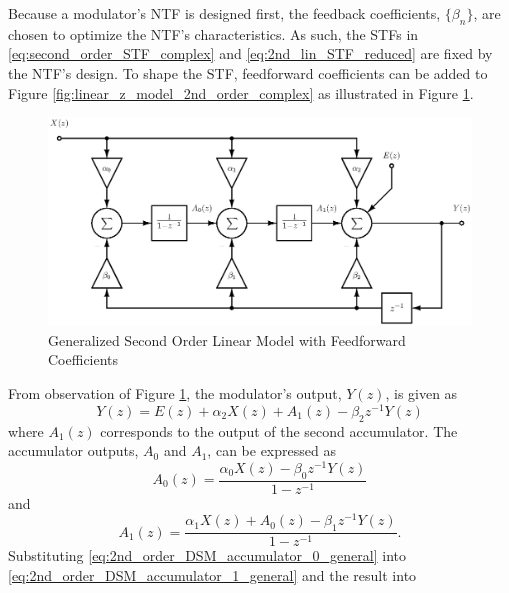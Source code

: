 Because a \DS modulator's NTF is designed first, the feedback coefficients,
$\{\beta_n\}$, 
are chosen to optimize the NTF's characteristics. As such, the STFs in
\eqref{eq:second_order_STF_complex} and \eqref{eq:2nd_lin_STF_reduced} are fixed by the
NTF's design. To shape the STF, feedforward coefficients can be added to Figure
\ref{fig:linear_z_model_2nd_order_complex} as illustrated in Figure
\ref{fig:general_2nd_order}.
\begin{figure}
  \centering
  \includegraphics[width=\textwidth]{./final_figures/general_2nd_order.eps}
  \caption[Second Order Linear Model with Feedforward Coefficients]{Generalized Second
Order Linear Model with Feedforward Coefficients}
  \label{fig:general_2nd_order}
\end{figure}
From observation of Figure \ref{fig:general_2nd_order}, the \DS modulator's output,
$Y(z)$, is given as 
\begin{equation}\label{eq:2nd_order_DSM_output_general}
 Y(z)=E(z)+\alpha_2 X(z)+A_1(z)-\beta_2 z^{-1}Y(z)
\end{equation}
where $A_1(z)$ corresponds to the output of the second accumulator. The accumulator
outputs, $A_{0}$ and $A_{1}$, can be expressed as
\begin{equation}\label{eq:2nd_order_DSM_accumulator_0_general}
  A_{0}(z) = \frac{\alpha_0 X(z)-\beta_0 z^{-1}Y(z)}{1-z^{-1}} 
\end{equation}
and
\begin{equation}\label{eq:2nd_order_DSM_accumulator_1_general}
  A_{1}(z) = \frac{\alpha_1 X(z)+ A_{0}(z)-\beta_1 z^{-1}Y(z)}{1-z^{-1}}\text{.}
\end{equation}
Substituting \eqref{eq:2nd_order_DSM_accumulator_0_general} into
\eqref{eq:2nd_order_DSM_accumulator_1_general} and the result into
